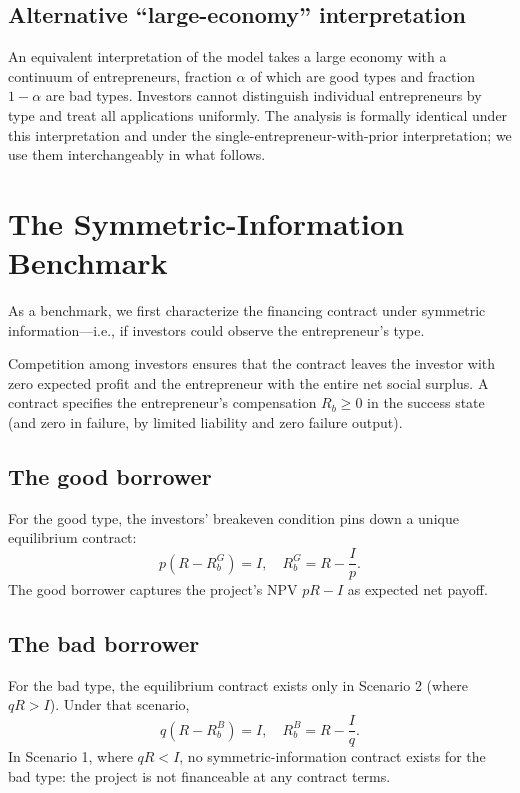 \documentclass[11pt,a4paper,oneside]{book}
\def\geq{\geqslant}
\theoremstyle{plain}
\theoremstyle{definition}
\theoremstyle{remark}
\numberwithin{equation}{chapter}
\begin{document}
\subsection{Alternative ``large-economy'' interpretation}

An equivalent interpretation of the model takes a large economy with a continuum of entrepreneurs, fraction $\alpha$ of which are good types and fraction $1 - \alpha$ are bad types.
Investors cannot distinguish individual entrepreneurs by type and treat all applications uniformly.
The analysis is formally identical under this interpretation and under the single-entrepreneur-with-prior interpretation; we use them interchangeably in what follows.

\section{The Symmetric-Information Benchmark}
\label{sec:lemons-symmetric}

As a benchmark, we first characterize the financing contract under symmetric information---i.e., if investors could observe the entrepreneur's type.

Competition among investors ensures that the contract leaves the investor with zero expected profit and the entrepreneur with the entire net social surplus.
A contract specifies the entrepreneur's compensation $R_b \geq 0$ in the success state (and zero in failure, by limited liability and zero failure output).

\subsection{The good borrower}

For the good type, the investors' breakeven condition pins down a unique equilibrium contract:
\begin{equation}\label{eq:lemons-Rb-G}
  p(R - R_b^{G}) = I,
  \quad
  R_b^{G} = R - \frac{I}{p}.
\end{equation}
The good borrower captures the project's NPV $pR - I$ as expected net payoff.

\subsection{The bad borrower}

For the bad type, the equilibrium contract exists only in Scenario 2 (where $qR > I$).
Under that scenario,
\begin{equation}\label{eq:lemons-Rb-B}
  q(R - R_b^{B}) = I,
  \quad
  R_b^{B} = R - \frac{I}{q}.
\end{equation}
In Scenario 1, where $qR < I$, no symmetric-information contract exists for the bad type: the project is not financeable at any contract terms.
\end{document}
